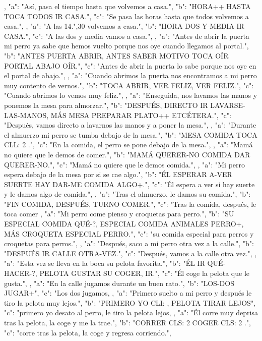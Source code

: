 ,
{
"a": "Así, pasa el tiempo hasta que volvemos a casa.",
"b": "HORA++ HASTA TOCA TODOS IR CASA.",
"c": "Se pasa las horas hasta que todos volvemos a casa.",
}
,
{
"a": "A las 14.",30 volvemos a casa.",
"b": "HORA DOS Y-MEDIA IR CASA.",
"c": "A las dos y media vamos a casa.",
}
,
{
"a": "Antes de abrir la puerta mi perro ya sabe que hemos vuelto porque nos oye cuando llegamos al portal.",
"b": "ANTES PUERTA ABRIR, ANTES SABER MOTIVO TOCA OÍR PORTAL ABAJO OÍR.",
"c": "Antes de abrir la puerta lo sabe porque nos oye en el portal de abajo.",
}
,
{
"a": "Cuando abrimos la puerta nos encontramos a mi perro muy contento de vernos.",
"b": "TOCA ABRIR, VER FELIZ, VER FELIZ.",
"c": "Cuando abrimos lo vemos muy feliz.",
}
,
{
"a": "Enseguida, nos lavamos las manos y ponemos la mesa para almorzar.",
"b": "DESPUÉS, DIRECTO IR LAVARSE-LAS-MANOS, MÁS MESA PREPARAR PLATO++ ETCÉTERA.",
"c": "Después, vamos directo a lavarnos las manos y a poner la mesa.",
}
,
{
"a": "Durante el almuerzo mi perro se tumba debajo de la mesa.",
"b": "MESA COMIDA TOCA CLL: 2 .",
"c": "En la comida, el perro se pone debajo de la mesa.",
}
,
{
"a": "Mamá no quiere que le demos de comer.",
"b": "MAMÁ QUERER-NO COMIDA DAR QUERER-NO.",
"c": "Mamá no quiere que le demos comida.",
}
,
{
"a": "Mi perro espera debajo de la mesa por si se cae algo.",
"b": "ÉL ESPERAR A-VER SUERTE HAY DAR-ME COMIDA ALGO+.",
"c": "Él espera a ver si hay suerte y le damos algo de comida.",
}
,
{
"a": "Tras el almuerzo, le damos su comida.",
"b": "FIN COMIDA, DESPUÉS, TURNO COMER.",
"c": "Tras la comida, después, le toca comer
}
,
{
"a": "Mi perro come pienso y croquetas para perro.",
"b": "SU ESPECIAL COMIDA QUÉ-?, ESPECIAL COMIDA ANIMALES PERRO+, MÁS CROQUETA ESPECIAL PERRO.",
"c": "su comida especial para perros y croquetas para perros.",
}
,
{
"a": "Después, saco a mi perro otra vez a la calle.",
"b": "DESPUÉS IR CALLE OTRA-VEZ.",
"c": "Después, vamos a la calle otra vez.",
}
,
{
"a": "Esta vez se lleva en la boca su pelota favorita.",
"b": "ÉL IR QUÉ-HACER-?, PELOTA GUSTAR SU COGER, IR.",
"c": "Él coge la pelota que le gusta.",
}
,
{
"a": "En la calle jugamos durante un buen rato.",
"b": "LOS-DOS JUGAR+",
"c": "Los dos jugamos,
}
,
{
"a": "Primero suelto a mi perro y después le tiro la pelota muy lejos.",
"b": "PRIMERO YO CLI: , PELOTA TIRAR LEJOS",
"c": "primero yo desato al perro, le tiro la pelota lejos,
}
,
{
"a": "Él corre muy deprisa tras la pelota, la coge y me la trae.",
"b": "CORRER CLS: 2  COGER CLS: 2 .",
"c": "corre tras la pelota, la coge y regresa corriendo.",
}
